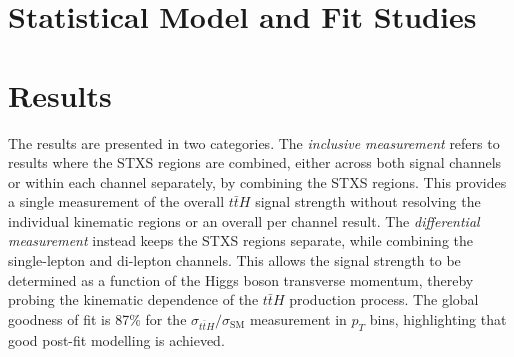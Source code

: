 \section{Statistical Model and Fit Studies}

\section{Results}
The results are presented in two categories. The \textit{inclusive measurement} refers to results where the STXS regions are combined, either across both signal channels or within each channel separately, by combining the STXS regions. This provides a single measurement of the overall $t\bar{t}H$ signal strength without resolving the individual kinematic regions or an overall per channel result. The \textit{differential measurement} instead keeps the STXS regions separate, while combining the single-lepton and di-lepton channels. This allows the signal strength to be determined as a function of the Higgs boson transverse momentum, thereby probing the kinematic dependence of the $t\bar{t}H$ production process. The global goodness of fit is 87\% for the $\sigma_{t\bar{t}H}/\sigma_{\text{SM}}$ measurement in $p_T$ bins, highlighting that good post-fit modelling is achieved.
